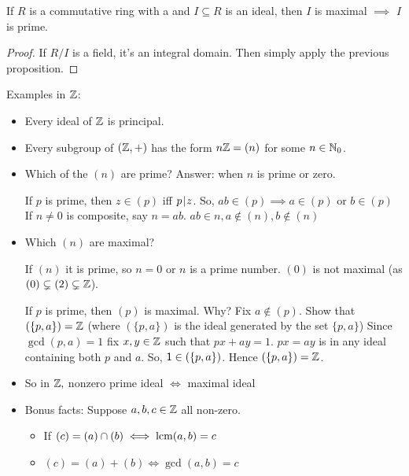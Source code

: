 \documentclass[notes.tex]{subfiles}
\begin{document}
\begin{corollary}
	If $R$ is a commutative ring with a \one and $I\subseteq R$ is an ideal, then $I$ is maximal $\implies$ $I$ is prime.
\end{corollary}
\begin{proof}
	If $R/I$ is a field, it's an integral domain. Then simply apply the previous proposition.
\end{proof}

\begin{eg}
	Examples in $\mathbb{Z}$:
	\begin{itemize}
		\item Every ideal of $\mathbb{Z}$ is principal.
		\item Every subgroup of $(\mathbb{Z}, +)$ has the form $n\mathbb{Z} = (n)$ for some $n\in \mathbb{N}_0$.
		\item Which of the $(n)$ are prime? Answer: when $n$ is prime or zero.

		If $p$ is prime, then $z\in (p)$ iff $p\mkern2mu|\mkern1mu z$.
		So, $ab\in (p)\implies a\in (p)$ or $b\in (p)$
		If $n\ne 0$ is composite, say $n=ab$. $ab\in n, a\notin(n), b\notin(n)$

		\item Which $(n)$ are maximal?

		If $(n)$ it is prime, so $n=0$ or $n$ is a prime number.
		$(0)$ is not maximal (as $(0) \subsetneq (2)\subsetneq \mathbb{Z}$).

		If $p$ is prime, then $(p)$ is maximal. Why? Fix $a\notin (p)$. Show that $(\{p, a\}) = \mathbb{Z}$ (where $(\{p, a\})$ is the ideal generated by the set $\{p, a\}$)
		Since $\gcd(p, a) =1$ fix $x, y\in \mathbb{Z}$ such that $px + ay = 1$. $px = ay$ is in any ideal containing both $p$ and $a$. So, $\mathsf{1}\in (\{p, a\})$. Hence $(\{p, a\}) = \mathbb{Z}$.

		\item So in $\mathbb{Z},$ nonzero prime ideal $\iff$ maximal ideal

		\item Bonus facts: Suppose $a, b, c\in\mathbb{Z}$ all non-zero.
		\begin{itemize}
			\item If $(c) = (a) \cap (b) \iff \operatorname{\mathrm{lcm}}(a, b) = c$
			\item $(c) = (a) + (b) \iff \gcd(a, b) = c$
		\end{itemize}
	\end{itemize}
\end{eg}
\end{document}
